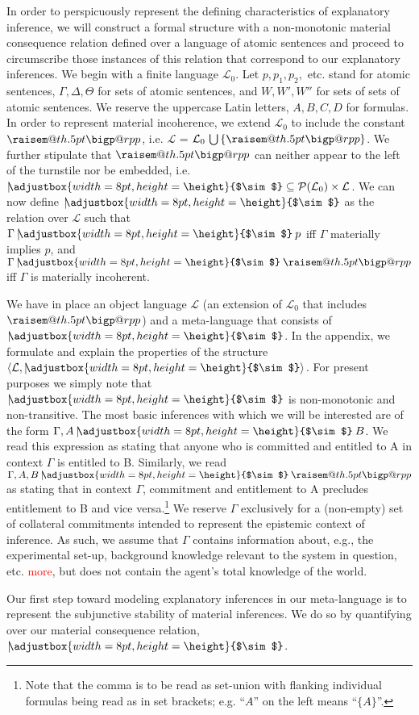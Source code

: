 \documentclass{svjour3}                     %
\makeatletter
\newcommand{\raisemath}[1]{\mathpalette{\raisem@th{#1}}}
\newcommand{\raisem@th}[3]{\raisebox{#1}{$#2#3$}}
\newcommand{\bigperpp}{%
  \mathop{\mathpalette\bigp@rpp\relax}%
  \displaylimits
}
\newcommand{\bigp@rpp}[2]{%
  \vcenter{
    \m@th\hbox{\scalebox{\ifx#1\displaystyle1.3\else1.3\fi}{$#1\perp$}}
  }%
}
\newcommand{\bigperp}{\raisemath{.5pt}{\bigperpp}}
\newcommand{\ssim}{%
     \setbox0=\hbox{$\sim$}%
     \adjustbox{width=8pt,height=\height}{$\sim$}
}
\newcommand{\nmc}{\mathbin{\mid\joinrel\!\!\ssim}}
\makeatother
\begin{document}
In order to perspicuously represent the defining characteristics of explanatory inference, we will construct a formal structure with a non-monotonic material consequence relation defined over a language of atomic sentences and proceed to circumscribe those instances of this relation that correspond to our explanatory inferences. We begin with a finite language $ \mathcal{L}_{0} $. Let $ p, p_1, p_2, $ etc. stand for atomic sentences, $ \Gamma, \Delta, \Theta $ for sets of atomic sentences, and $ W, W',W'' $ for sets of sets of atomic sentences. We reserve the uppercase Latin letters, $ A, B, C, D $ for formulas. In order to represent material incoherence, we extend $ \mathcal{L}_0 $ to include the constant $ \bigperp $, i.e. $ \mathcal{L} $ = $ \mathcal{L}_0 \,\bigcup \,\{\bigperp\}$. We further stipulate that $ \bigperp $ can neither appear to the left of the turnstile nor be embedded, i.e. $ {\nmc} \subseteq \mathcal{P}(\mathcal{L}_0) \times \mathcal{L} $. We can now define $ \nmc $ as the relation over $ \mathcal{L} $ such that $  \Gamma\nmc p $ iff  $\Gamma$ materially implies $ p $, and $\Gamma\nmc \bigperp $ iff $ \Gamma $ is materially incoherent. 

We have in place an object language $ \mathcal{L} $ (an extension of  $ \mathcal{L}_0 $ that includes $ \bigperp $) and a meta-language that consists of $ \nmc $.  In the appendix, we formulate and explain the properties of the structure $ \langle \mathcal{L}, \nmc \rangle  $. For present purposes we simply note that $ \nmc $ is non-monotonic and non-transitive.  The most basic inferences with which we will be interested are of the form $ \Gamma, A \nmc B $.  We read this expression as stating that anyone who is committed and entitled to A in context $ \Gamma $ is entitled to B. Similarly, we read  $\Gamma, A, B \nmc \bigperp $ as stating that in context $ \Gamma $, commitment and entitlement to A  precludes entitlement to B and vice versa.\footnote{Note that the comma is to be read as set-union with flanking individual formulas being read as in set brackets; e.g. ``$ A $'' on the left means ``$ \{ A\} $''.}  We reserve $ \Gamma $ exclusively for a (non-empty) set of collateral commitments intended to represent the epistemic context of inference. As such, we assume that $ \Gamma $ contains information about, e.g., the experimental set-up, background knowledge relevant to the system in question, etc. \textcolor{red}{more}, but does not contain the agent's total knowledge of the world. 

Our first step toward modeling explanatory inferences in our meta-language is to represent the subjunctive stability of material inferences. We do so by quantifying over our material consequence relation, $ \nmc $. \newline
\end{document}
